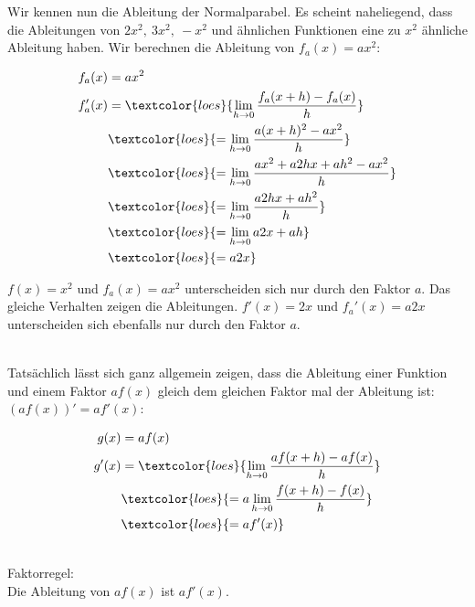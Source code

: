 Wir kennen nun die Ableitung der Normalparabel. Es scheint naheliegend, dass die Ableitungen von \(2x^2,\ 3x^2,\ -x^2\) und ähnlichen Funktionen eine zu \(x^2\) ähnliche Ableitung haben. Wir berechnen die Ableitung von \(f_a(x)=ax^2\):\\
\begin{minipage}[t]{\textwidth}
	\begin{minipage}{0.4\textwidth}
		\begin{align*}
			f_a(x)&=ax^2\\
			f_a'(x)&=\textcolor{loes}{\lim\limits_{h\to 0}\frac{f_a(x+h)-f_a(x)}{h}}\\
			&\textcolor{loes}{=\lim\limits_{h\to 0}\frac{a(x+h)^2-ax^2}{h}}\\
			&\textcolor{loes}{=\lim\limits_{h\to 0}\frac{ax^2+a2hx+ah^2-ax^2}{h}}\\
			&\textcolor{loes}{=\lim\limits_{h\to 0}\frac{a2hx+ah^2}{h}}\\
			&\textcolor{loes}{=\lim\limits_{h\to 0}a2x+ah}\\
			&\textcolor{loes}{=a2x}\\
		\end{align*}
	\end{minipage}
	\begin{minipage}{0.6\textwidth}
		\textcolor{loes}{\(f(x)=x^2\) und \(f_a(x)=ax^2\) unterscheiden sich nur durch den Faktor \(a\). Das gleiche Verhalten zeigen die Ableitungen. \(f'(x)=2x\) und \(f_a'(x)=a2x\) unterscheiden sich ebenfalls nur durch den Faktor \(a\).}
	\end{minipage}
\end{minipage}\\
Tatsächlich lässt sich ganz allgemein zeigen, dass die Ableitung einer Funktion und einem Faktor \(af(x)\) gleich dem gleichen Faktor mal der Ableitung ist: \((af(x))'=af'(x)\):\\
\begin{minipage}[t]{\textwidth}
	\begin{minipage}{0.5\textwidth}
		\begin{align*}
			g(x)&=af(x)\\
			g'(x)&=\textcolor{loes}{\lim\limits_{h\to 0}\frac{af(x+h)-af(x)}{h}}\\
			&\textcolor{loes}{=a\lim\limits_{h\to 0}\frac{f(x+h)-f(x)}{h}}\\
			&\textcolor{loes}{=af'(x)}\\
		\end{align*}
	\end{minipage}
	\begin{minipage}{0.5\textwidth}
		\begin{tcolorbox}
			\phantom{text}\\
			\textcolor{loestc}{Faktorregel:\\
				Die Ableitung von \(af(x)\) ist \(af'(x)\).}\\
		\end{tcolorbox}
	\end{minipage}
\end{minipage}\\